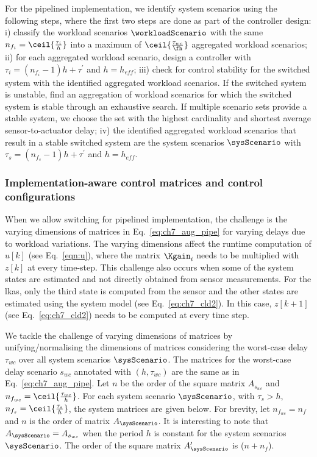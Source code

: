For the pipelined implementation, we identify system scenarios using the following steps, where the first two steps are done as part of the controller design:
i) classify the workload scenarios $\workloadScenario$ with the same $n_{f_i}=\ceil{\frac{\tau_{i}}{h}}$ into a maximum of $\ceil{\frac{\tau_{wc}}{\fh}}$ aggregated workload scenarios; 
ii) for each aggregated workload scenario, design a controller with $\tau_i=(n_{f_i}-1)h+\tau^{\prime}$ and $h=h_{\mathit{eff}}$; 
iii) check for control stability for the switched system with the identified aggregated workload scenarios. If the switched system is unstable, find an aggregation of workload scenarios for which the switched system is stable through an exhaustive search. If multiple scenario sets provide a stable system, we choose the set with the highest cardinality and shortest average sensor-to-actuator delay; 
iv) the identified aggregated workload scenarios that result in a stable switched system are the system scenarios $\sysScenario$ with $\tau_s=(n_{f_s}-1)h+\tau^{\prime}$ and $h=h_{\mathit{eff}}$.

\subsubsection{Implementation-aware control matrices and control configurations}
\label{sec:ch7_implementation-aware control matrices}
When we allow switching for pipelined implementation, the challenge is the varying dimensions of matrices in Eq.~\ref{eq:ch7_aug_pipe} for varying delays due to workload variations.
The varying dimensions affect the runtime computation of $u[k]$ (see Eq.~\ref{eqn:u}), where the matrix $\Kgain_i$ needs to be multiplied with $z[k]$ at every time-step. 
This challenge also occurs when some of the system states are estimated and not directly obtained from sensor measurements. For the \gls{lkas}, only the third state is computed from the sensor and the other states are estimated using the system model (see Eq.~\ref{eq:ch7_cld2}).
In this case, $z[k+1]$ (see Eq.~\ref{eq:ch7_cld2}) needs to be computed at every time step.

We tackle the challenge of varying dimensions of matrices by unifying/normalising the dimensions of matrices considering the worst-case delay $\tau_{wc}$ over all system scenarios $\sysScenario$. 
The matrices for the worst-case delay scenario $s_{wc}$ annotated with $(h,\tau_{wc})$ are the same as in Eq.~\ref{eq:ch7_aug_pipe}. 
Let $n$ be the order of the square matrix $A_{s_{wc}}$ and $n_{f_{wc}}=\ceil{\frac{\tau_{wc}}{h}}$.
For each system scenario $\sysScenario$, with $\tau_s > h$,
$n_{f_s}=\ceil{\frac{\tau_{s}}{h}}$, the system matrices are given below. For brevity, let $n_{f_{wc}}=n_f$ and $n$ is the order of matrix $A_{\sysScenario}$.
It is interesting to note that $A_{\sysScenario}=A_{s_{wc}}$ when the period $h$ is constant for the system scenarios $\sysScenario$.
The order of the square matrix $A_{\sysScenario}^{\prime}$ is ($n+n_f$).

